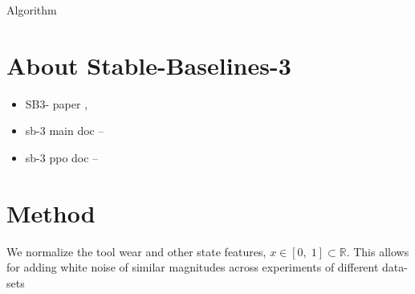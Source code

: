 \documentclass[]{article}
\begin{document}
Algorithm
%

\section{About Stable-Baselines-3}
\begin{itemize}
	\item SB3- paper \citep{SB3}, \cite{SB3}
	\item sb-3 main doc -- \citep{SB3-main-doc}
	\item sb-3 ppo doc -- \citep{SB3-PPO-doc}
\end{itemize}

\section{Method}

We normalize the tool wear and other state features, $x \in [0,\;1] \subset \mathbb{R} $. This allows for adding white noise of similar magnitudes across experiments of different data-sets
\end{document}
